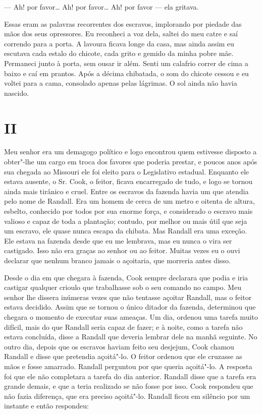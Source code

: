 --- Ah! por favor\ldots{} Ah! por favor\ldots{} Ah! por favor --- ela
gritava.

Essas eram as palavras recorrentes dos escravos, implorando por piedade
das mãos dos seus opressores. Eu reconheci a voz dela, saltei do meu
catre e saí correndo para a porta. A lavoura ficava longe da casa, mas
ainda assim eu escutava cada estalo do chicote, cada grito e gemido da
minha pobre mãe. Permaneci junto à porta, sem ousar ir além. Senti um
calafrio correr de cima a baixo e caí em prantos. Após a décima
chibatada, o som do chicote cessou e eu voltei para a cama, consolado
apenas pelas lágrimas. O sol ainda não havia nascido.

\chapter{II}

Meu senhor era um demagogo político e logo encontrou quem estivesse
disposto a obter"-lhe um cargo em troca dos favores que poderia prestar,
e poucos anos após sua chegada ao Missouri ele foi eleito para o
Legislativo estadual. Enquanto ele estava ausente, o Sr. Cook, o feitor,
ficava encarregado de tudo, e logo se tornou ainda mais tirânico e
cruel. Entre os escravos da fazenda havia um que atendia pelo nome de
Randall. Era um homem de cerca de um metro e oitenta de altura, esbelto,
conhecido por todos por sua enorme força, e considerado o escravo mais
valioso e capaz de toda a plantação; contudo, por melhor ou mais útil
que seja um escravo, ele quase nunca escapa da chibata. Mas Randall era
uma exceção. Ele estava na fazenda desde que eu me lembrava, mas eu
nunca o vira ser castigado. Isso não era graças ao senhor ou ao feitor.
Muitas vezes eu o ouvi declarar que nenhum branco jamais o açoitaria,
que morreria antes disso.

Desde o dia em que chegara à fazenda, Cook sempre declarara que podia e
iria castigar qualquer crioulo que trabalhasse sob o seu comando no
campo. Meu senhor lhe dissera inúmeras vezes que não tentasse açoitar
Randall, mas o feitor estava decidido. Assim que se tornou o único
ditador da fazenda, determinou que chegara o momento de executar suas
ameaças. Um dia, ordenou uma tarefa muito difícil, mais do que Randall
seria capaz de fazer; e à noite, como a tarefa não estava concluída,
disse a Randall que deveria lembrar dele na manhã seguinte. No outro
dia, depois que os escravos haviam feito seu desjejum, Cook chamou
Randall e disse que pretendia açoitá"-lo. O feitor ordenou que ele
cruzasse as mãos e fosse amarrado. Randall perguntou por que queria
açoitá"-lo. A resposta foi que ele não completara a tarefa do dia
anterior. Randall disse que a tarefa era grande demais, e que a teria
realizado se não fosse por isso. Cook respondeu que não fazia diferença,
que era preciso açoitá"-lo. Randall ficou em silêncio por um instante e
então respondeu:

